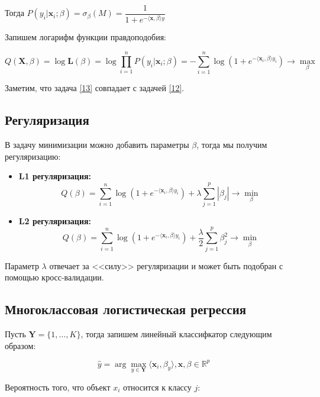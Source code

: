 \documentclass[11pt, oneside]{article}   	%
\begin{document}
Тогда $P(y_i | \bm{x}_i; \beta) = \sigma_\beta(M) = \dfrac{1}{1 + e^{- \langle \bm{x}, \beta \rangle y}}$

Запишем логарифм функции правдоподобия:

\begin{equation}
	Q(\bm{X}, \beta) = \log \bm{L}(\beta) = \log 	
	\prod\limits_{i = 1}^{n} P(y_i | \bm{x}_i; \beta) = - \sum\limits_{i = 1}^{n} \log(1 + e^{- \langle \bm{x}_i, \beta \rangle y_i}) \rightarrow \max\limits_{\beta}
	\label{13}
\end{equation}

Заметим, что задача \ref{13} совпадает с задачей \ref{12}.

\subsection{Регуляризация}

В задачу минимизации можно добавить параметры $\beta$, тогда мы получим регуляризацию:

\begin{itemize}
	\item \textbf{L1 регуляризация:}  $$Q(\beta) = \sum\limits_{i = 1}^{n} \log(1 + e^{- \langle \bm{x}_i, \beta \rangle y_i}) + \lambda \sum\limits_{j = 1}^{p}|\beta_j| \rightarrow \min\limits_{\beta}$$
	\item \textbf{L2 регуляризация:}  $$Q(\beta) = \sum\limits_{i = 1}^{n} \log(1 + e^{- \langle \bm{x}_i, \beta \rangle y_i}) + \frac{\lambda}{2} \sum\limits_{j = 1}^{p}\beta_j^2 \rightarrow \min\limits_{\beta}$$
\end{itemize}

Параметр $\lambda$ отвечает за <<силу>> регуляризации и может быть подобран с помощью кросс-валидации.

\subsection{Многоклассовая логистическая регрессия}

Пусть $\bm{Y} = \{1, \dotsc , K\}$, тогда запишем линейный классифкатор следующим образом:

\begin{equation}
	\hat{y} = \arg \max\limits_{y \in \bm{Y}} \langle \bm{x}_i, \beta_y \rangle, \bm{x}, \beta \in \mathbb{R}^p
	\label{14}
\end{equation}

Вероятность того, что объект $x_i$ относится к классу $j$:
\end{document}
